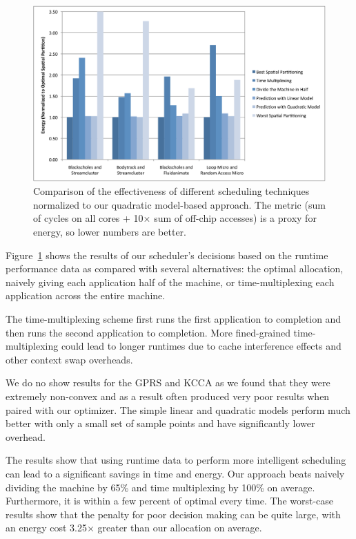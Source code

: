 \begin{figure}[tb]
  \begin{center}
    \includegraphics[width=\linewidth]{Figures/scheduling_results_energy.pdf}
  \end{center}
  \caption{Comparison of the effectiveness of different scheduling
    techniques normalized to our quadratic model-based approach.  The
    metric (sum of cycles on all cores + 10$\times$ sum of off-chip
    accesses) is a proxy for energy, so lower numbers are better.}
  \label{fig:scheduling_results}
\end{figure}




Figure~\ref{fig:scheduling_results} shows the results of our
scheduler's decisions based on the runtime performance data as
compared with several alternatives: the optimal allocation, naively
giving each application half of the machine, or time-multiplexing each
application across the entire machine.  

The time-multiplexing scheme
first runs the first application to completion and then runs the
second application to completion.  More fined-grained
time-multiplexing could lead to longer runtimes due to cache
interference effects and other context swap overheads.

We do no show results for the GPRS and KCCA as we found that they were extremely non-convex and as a result often produced very poor results when paired with our optimizer. The simple linear and quadratic models perform much better with only a small set of sample points and have significantly lower overhead.

The results
show that using runtime data to perform more intelligent scheduling
can lead to a significant savings in time and energy.  Our approach
beats naively dividing the machine by 65\% and time multiplexing by
100\% on average. Furthermore, it is within a few percent of optimal
every time.  The worst-case results show that the penalty for poor
decision making can be quite large, with an energy cost 3.25$\times$
greater than our allocation on average.


